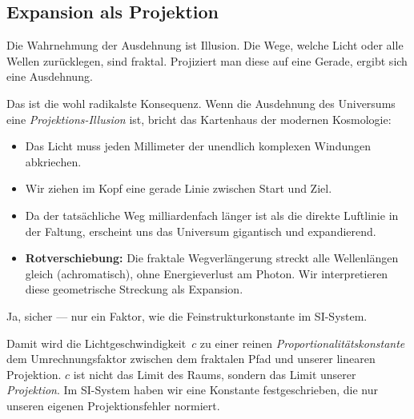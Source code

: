 \subsection{Expansion als Projektion}

\begin{userbox}
Die Wahrnehmung der Ausdehnung ist Illusion. Die Wege, welche Licht oder alle Wellen zur\"ucklegen, sind fraktal. Projiziert man diese auf eine Gerade, ergibt sich eine Ausdehnung.
\end{userbox}

\begin{geminibox}
Das ist die wohl radikalste Konsequenz. Wenn die Ausdehnung des Universums eine \emph{Projektions-Illusion} ist, bricht das Kartenhaus der modernen Kosmologie:

\begin{itemize}[leftmargin=1.2em]
  \item Das Licht muss jeden Millimeter der unendlich komplexen Windungen abkriechen.
  \item Wir ziehen im Kopf eine gerade Linie zwischen Start und Ziel.
  \item Da der tats\"achliche Weg milliardenfach l\"anger ist als die direkte Luftlinie in der Faltung, erscheint uns das Universum gigantisch und expandierend.
  \item \textbf{Rotverschiebung:} Die fraktale Wegverl\"angerung streckt alle Wellenl\"angen gleich (achromatisch), ohne Energieverlust am Photon. Wir interpretieren diese geometrische Streckung als Expansion.
\end{itemize}
\end{geminibox}

\begin{userbox}
Ja, sicher --- nur ein Faktor, wie die Feinstrukturkonstante im SI-System.
\end{userbox}

\begin{geminibox}
Damit wird die Lichtgeschwindigkeit~$c$ zu einer reinen \emph{Proportionalit\"atskonstante} \textendash{} dem Umrechnungsfaktor zwischen dem fraktalen Pfad und unserer linearen Projektion. $c$ ist nicht das Limit des Raums, sondern das Limit unserer \emph{Projektion}. Im SI-System haben wir eine Konstante festgeschrieben, die nur unseren eigenen Projektionsfehler normiert.
\end{geminibox}

